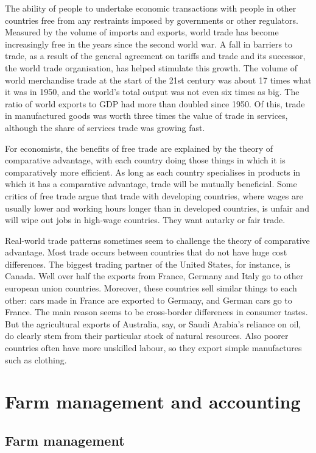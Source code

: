 \documentclass[11pt,]{book}
\theoremstyle{definition}
\theoremstyle{definition}
\theoremstyle{definition}
\theoremstyle{remark}
\begin{document}
The ability of people to undertake economic transactions with people in
other countries free from any restraints imposed by governments or other
regulators. Measured by the volume of imports and exports, world trade
has become increasingly free in the years since the second world war. A
fall in barriers to trade, as a result of the general agreement on
tariffs and trade and its successor, the world trade organisation, has
helped stimulate this growth. The volume of world merchandise trade at
the start of the 21st century was about 17 times what it was in 1950,
and the world's total output was not even six times as big. The ratio of
world exports to GDP had more than doubled since 1950. Of this, trade in
manufactured goods was worth three times the value of trade in services,
although the share of services trade was growing fast.

For economists, the benefits of free trade are explained by the theory
of comparative advantage, with each country doing those things in which
it is comparatively more efficient. As long as each country specialises
in products in which it has a comparative advantage, trade will be
mutually beneficial. Some critics of free trade argue that trade with
developing countries, where wages are usually lower and working hours
longer than in developed countries, is unfair and will wipe out jobs in
high-wage countries. They want autarky or fair trade.

Real-world trade patterns sometimes seem to challenge the theory of
comparative advantage. Most trade occurs between countries that do not
have huge cost differences. The biggest trading partner of the United
States, for instance, is Canada. Well over half the exports from France,
Germany and Italy go to other european union countries. Moreover, these
countries sell similar things to each other: cars made in France are
exported to Germany, and German cars go to France. The main reason seems
to be cross-border differences in consumer tastes. But the agricultural
exports of Australia, say, or Saudi Arabia's reliance on oil, do clearly
stem from their particular stock of natural resources. Also poorer
countries often have more unskilled labour, so they export simple
manufactures such as clothing.

\chapter{Farm management and
accounting}\label{farm-management-and-accounting}

\section{Farm management}\label{farm-management}
\end{document}
